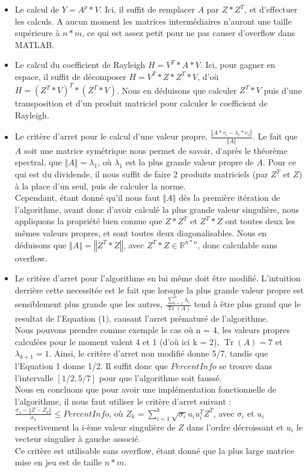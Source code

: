 \documentclass[a4paper,12pt]{article}
\DeclareMathOperator{\Tr}{Tr}
\newcommand{\norme}[1]{\left\Vert #1\right\Vert}
\begin{document}
        \begin{itemize}
            \item Le calcul de $Y = A^p*V$. Ici, il suffit de remplacer $A$ par $Z*Z^T$, et d'effectuer les calculs. A aucun moment les matrices intermédiaires n'auront une taille supérieure à $n*m$, ce qui est assez petit pour ne pas causer d'overflow dans MATLAB.
            \item Le calcul du coefficient de Rayleigh $H = V^T*A*V$. Ici, pour gagner en espace, il suffit de décomposer $H = V^T*Z*Z^T*V$, d'où $H = (Z^T*V)^T*(Z^T*V)$. Nous en déduisons que calculer $Z^T*V$ puis d'une transposition et d'un produit matriciel pour calculer le coefficient de Rayleigh.
            \item Le critère d'arret pour le calcul d'une valeur propre, $\frac{\norme{A*v_i - \lambda_i*v_i}}{\norme{A}}$. Le fait que $A$ soit une matrice symétrique nous permet de savoir, d'après le théorème spectral, que $\norme{A} = \lambda_1$, où $\lambda_1$ est la plus grande valeur propre de $A$. Pour ce qui est du dividende, il nous suffit de faire 2 produits matriciels (par $Z^T$ et $Z$) à la place d'un seul, puis de calculer la norme. \\
            Cependant, étant donné qu'il nous faut $\norme{A}$ dès la première itération de l'algorithme, avant donc d'avoir calculé la plus grande valeur singulière, nous appliquons la propriété bien connue que $Z*Z^T$ et $Z^T*Z$ ont toutes deux les mêmes valeurs propres, et sont toutes deux diagonalisables. Nous en déduisons que $\norme{A} = \norme{Z^T*Z}$, avec $Z^T*Z \in \mathbb{R}^{n*n}$, donc calculable sans overflow.
            \item Le critère d'arret pour l'algorithme en lui même doit être modifié. L'intuition derrière cette necessitée est le fait que lorsque la plus grande valeur propre est sensiblement plus grande que les autres, $\frac{\sum\limits_{i=1}^n \lambda_i}{\Tr(A)}$ tend à être plus grand que le resultat de l'Equation (1), causant l'arret prématuré de l'algorithme. \\
            Nous pouvons prendre comme exemple le cas où n = 4, les valeurs propres calculées pour le moment valent 4 et 1 (d'où ici k = 2), $\Tr(A) = 7$ et $\lambda_{k+1} = 1$. Ainsi, le critère d'arret non modifié donne 5/7, tandis que l'Equation 1 donne 1/2. Il suffit donc que $PercentInfo$ se trouve dans l'intervalle $[1/2,5/7]$ pour que l'algorithme soit faussé. \\
            Nous en concluons que pour avoir une implémentation fonctionnelle de l'algorithme, il nous faut utiliser le critère d'arret suivant : $\frac{\sigma_1 - \norme{Z - Z_k}}{\sigma_1} \leq PercentInfo$, où $Z_k = \sum\limits_{i=1}^k \sqrt{\sigma_i}u_iu_i^TZ^T$, avec $\sigma_i$ et $u_i$ respectivement la i-ème valeur singulière de $Z$ dans l'ordre décroissant et $u_i$ le vecteur singulier à gauche associé. \\
            Ce critère est utilisable sans overflow, étant donné que la plus large matrice mise en jeu est de taille $n*m$.
        \end{itemize}
\bigskip
\end{document}
